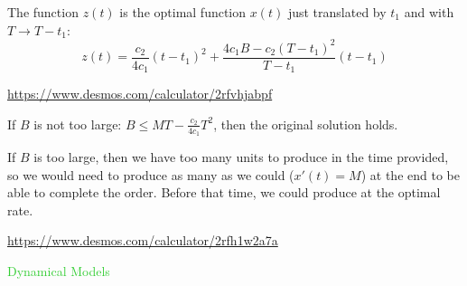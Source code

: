\documentclass{workbook}
\begin{document}
\begin{solution}
\begin{slide}
\begin{parts}
	The function $z(t)$ is the optimal function $x(t)$ just translated by $t_1$ and with $T \to T-t_1$:
		\[ 
			z(t) = \frac{c_2}{4c_1} (t-t_1)^2 + \frac{4c_1 B-c_2 (T-t_1)^2}{T-t_1} (t-t_1)
		\]

	\url{https://www.desmos.com/calculator/2rfvhjabpf}
	
	\item If $B$ is not too large: $B\leq MT-\frac{c_{2}}{4c_{1}}T^{2}$, then the original solution holds.
		
		If $B$ is too large, then we have too many units to produce in the time provided, so we would need to produce as many as we could ($x'(t)=M$) at the end to be able to complete the order. 
		Before that time, we could produce at the optimal rate.

		\url{https://www.desmos.com/calculator/2rfh1w2a7a}
	
\end{parts}
\end{slide}
\end{solution}







%
%
%
%

\begin{slide}
\question

\vspace{3cm}

\begin{center}
\Huge 
\textcolor{LimeGreen}{Dynamical Models}
\end{center}

	
\end{slide}
\end{document}
